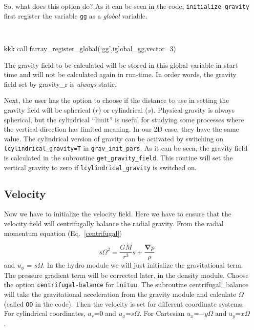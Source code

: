 \documentclass[a4paper,10pt]{article}
\renewcommand{\v}[1]{{\boldsymbol #1}} %
\newcommand{\del}{\v{\nabla}}
\newcommand{\grad}{\del}
\begin{document}
So, what does this option do? As it can be seen in the code, {\tt initialize\_gravity} first register the variable {\tt gg} as a {\it global} variable. 

{\tt 
\begin{tabbing}
  kkk\=\kill
\>call farray\_register\_global(`gg',iglobal\_gg,vector=3)\\
\end{tabbing}
}

The gravity field to be calculated will be stored in this global variable in start time and will not be calculated again in run-time. In order words, the gravity field set by gravity\_r is {\it always} static. 

Next, the user has the option to choose if the distance to use in setting the gravity field will be spherical ($r$) or cylindrical ($s$). Physical gravity is always spherical, but the cylindrical ``limit'' is useful for studying some processes where the vertical direction has limited meaning. In our 2D case, they have the same value. The cylindrical version of gravity can be activated by switching on {\tt lcylindrical\_gravity=T} in {\tt grav\_init\_pars}. As it can be seen, the gravity field is calculated in the subroutine {\tt get\_gravity\_field}. This routine will set the vertical gravity to zero if {\tt lcylindrical\_gravity} is switched on. 

\subsection{Velocity}

Now we have to initialize the velocity field. Here we have to ensure that the velocity field will centrifugally balance the radial gravity. From the radial momentum equation (Eq.~\ref{centrifugal})

\begin{equation}
s\Omega^2 = \frac{GM}{r^3}s + \frac{\grad{p}}{\rho}
\end{equation}and $u_\phi$ = $s\Omega$. In the hydro module we will just initialize the gravitational term. The pressure gradient term will be corrected later, in the density module. Choose the option {\tt centrifugal-balance} for {\tt inituu}. The subroutine centrifugal\_balance will take the gravitational acceleration from the gravity module and calculate $\Omega$ (called {\tt OO} in the code). Then the velocity is set for different coordinate systems. For cylindrical coordinates, $u_r$=0 and $u_\phi$=$s\Omega$. For Cartesian $u_x$=$-y\Omega$ and $u_y$=$x\Omega$.
\end{document}
